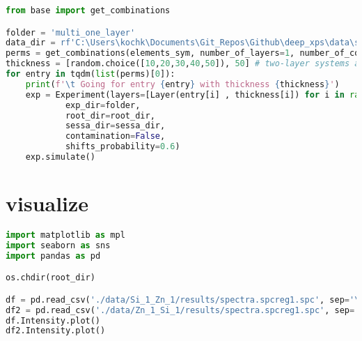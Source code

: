 \begin{lstlisting}[language=Python]
from base import get_combinations

folder = 'multi_one_layer'
data_dir = rf'C:\Users\kochk\Documents\Git_Repos\Github\deep_xps\data\simulation_data\{folder}'
perms = get_combinations(elements_sym, number_of_layers=1, number_of_combinations=30_000, lower=2, upper=4) # get one layer
thickness = [random.choice([10,20,30,40,50]), 50] # two-layer systems always have second layer of 50 Angstrom
for entry in tqdm(list(perms)[0]):
    print(f'\t Going for entry {entry} with thickness {thickness}')
    exp = Experiment(layers=[Layer(entry[i] , thickness[i]) for i in range(len(entry))],
            exp_dir=folder,
            root_dir=root_dir,
            sessa_dir=sessa_dir,
            contamination=False,
            shifts_probability=0.6)
    exp.simulate()
\end{lstlisting}

\hypertarget{visualize}{%
\section{visualize}\label{visualize}}

\begin{lstlisting}[language=Python]
import matplotlib as mpl
import seaborn as sns
import pandas as pd

os.chdir(root_dir)

df = pd.read_csv('./data/Si_1_Zn_1/results/spectra.spcreg1.spc', sep='\s+', names=['Energy [eV]', 'Intensity'], skiprows=1)
df2 = pd.read_csv('./data/Zn_1_Si_1/results/spectra.spcreg1.spc', sep='\s+', names=['Energy [eV]', 'Intensity'], skiprows=1)
df.Intensity.plot()
df2.Intensity.plot()
\end{lstlisting}
